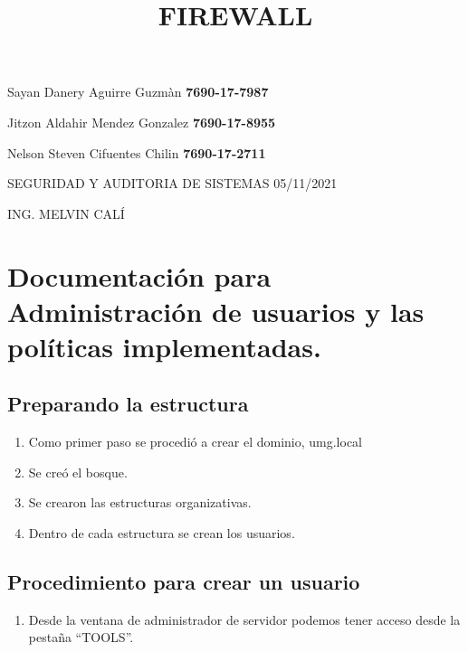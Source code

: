 \documentclass[
]{article}
\title{\protect\hypertarget{_Toc529637428}{}{}FIREWALL}
\subtitle{(PROYECTO Iii)

\texttt{[image: media/image1.png]}}
\author{}
\date{}
\begin{document}
\maketitle

Sayan Danery Aguirre Guzmàn \textbar{} \textbf{7690-17-7987}

Jitzon Aldahir Mendez Gonzalez \textbar{} \textbf{7690-17-8955}

Nelson Steven Cifuentes Chilin \textbar{} \textbf{7690-17-2711}

SEGURIDAD Y AUDITORIA DE SISTEMAS \textbar{} 05/11/2021

ING. MELVIN CALÍ

\hypertarget{documentaciuxf3n-para-administraciuxf3n-de-usuarios-y-las-poluxedticas-implementadas.}{%
\section{\texorpdfstring{Documentación para Administración de usuarios y
las políticas implementadas.
}{Documentación para Administración de usuarios y las políticas implementadas. }}\label{documentaciuxf3n-para-administraciuxf3n-de-usuarios-y-las-poluxedticas-implementadas.}}

\hypertarget{preparando-la-estructura}{%
\subsection{Preparando la estructura}\label{preparando-la-estructura}}

\begin{enumerate}
\def\labelenumi{\arabic{enumi}.}
\item
  Como primer paso se procedió a crear el dominio, umg.local
\item
  Se creó el bosque.
\item
  Se crearon las estructuras organizativas.
\item
  Dentro de cada estructura se crean los usuarios.
\end{enumerate}

\hypertarget{procedimiento-para-crear-un-usuario}{%
\subsection{Procedimiento para crear un
usuario}\label{procedimiento-para-crear-un-usuario}}

\begin{enumerate}
\def\labelenumi{\arabic{enumi}.}
\item
  Desde la ventana de administrador de servidor podemos tener acceso
  desde la pestaña ``TOOLS''.
\end{enumerate}
\end{document}
